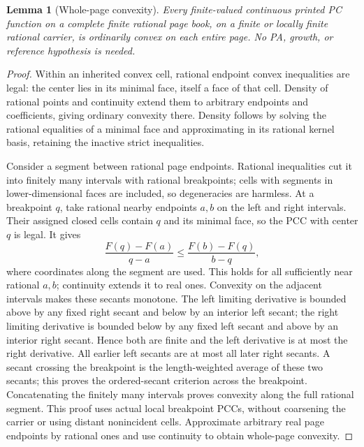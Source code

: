 \documentclass[11pt]{article}
\newtheorem{lemma}[theorem]{Lemma}
\theoremstyle{definition}\newtheorem{definition}[theorem]{Definition}
\theoremstyle{remark}\newtheorem{remark}[theorem]{Remark}
\begin{document}
\begin{lemma}[Whole-page convexity]\label{l:wholepage}
Every finite-valued continuous printed PC function on a complete finite rational page book, on a finite or locally finite rational carrier, is ordinarily convex on each entire page. No PA, growth, or reference hypothesis is needed.
\end{lemma}
\begin{proof}
Within an inherited convex cell, rational endpoint convex inequalities are legal: the center lies in its minimal face, itself a face of that cell. Density of rational points and continuity extend them to arbitrary endpoints and coefficients, giving ordinary convexity there. Density follows by solving the rational equalities of a minimal face and approximating in its rational kernel basis, retaining the inactive strict inequalities.

Consider a segment between rational page endpoints. Rational inequalities cut it into finitely many intervals with rational breakpoints; cells with segments in lower-dimensional faces are included, so degeneracies are harmless. At a breakpoint $q$, take rational nearby endpoints $a,b$ on the left and right intervals. Their assigned closed cells contain $q$ and its minimal face, so the PCC with center $q$ is legal. It gives
\[
 \frac{F(q)-F(a)}{q-a}\leq\frac{F(b)-F(q)}{b-q},
\]
where coordinates along the segment are used. This holds for all sufficiently near rational $a,b$; continuity extends it to real ones. Convexity on the adjacent intervals makes these secants monotone. The left limiting derivative is bounded above by any fixed right secant and below by an interior left secant; the right limiting derivative is bounded below by any fixed left secant and above by an interior right secant. Hence both are finite and the left derivative is at most the right derivative. All earlier left secants are at most all later right secants. A secant crossing the breakpoint is the length-weighted average of these two secants; this proves the ordered-secant criterion across the breakpoint. Concatenating the finitely many intervals proves convexity along the full rational segment. This proof uses actual local breakpoint PCCs, without coarsening the carrier or using distant nonincident cells. Approximate arbitrary real page endpoints by rational ones and use continuity to obtain whole-page convexity.
\end{proof}
\end{document}
